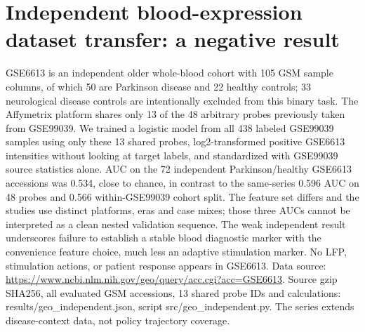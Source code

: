 \section{Independent blood-expression dataset transfer: a negative result}
GSE6613 is an independent older whole-blood cohort with 105 GSM sample columns, of which 50 are Parkinson disease and 22 healthy controls; 33 neurological disease controls are intentionally excluded from this binary task. The Affymetrix platform shares only 13 of the 48 arbitrary probes previously taken from GSE99039. We trained a logistic model from all 438 labeled GSE99039 samples using only these 13 shared probes, log2-transformed positive GSE6613 intensities without looking at target labels, and standardized with GSE99039 source statistics alone. AUC on the 72 independent Parkinson/healthy GSE6613 accessions was 0.534, close to chance, in contrast to the same-series 0.596 AUC on 48 probes and 0.566 within-GSE99039 cohort split. The feature set differs and the studies use distinct platforms, eras and case mixes; those three AUCs cannot be interpreted as a clean nested validation sequence. The weak independent result underscores failure to establish a stable blood diagnostic marker with the convenience feature choice, much less an adaptive stimulation marker. No LFP, stimulation actions, or patient response appears in GSE6613. Data source: \url{https://www.ncbi.nlm.nih.gov/geo/query/acc.cgi?acc=GSE6613}. Source gzip SHA256, all evaluated GSM accessions, 13 shared probe IDs and calculations: results/geo\_independent.json, script src/geo\_independent.py. The series extends disease-context data, not policy trajectory coverage.

